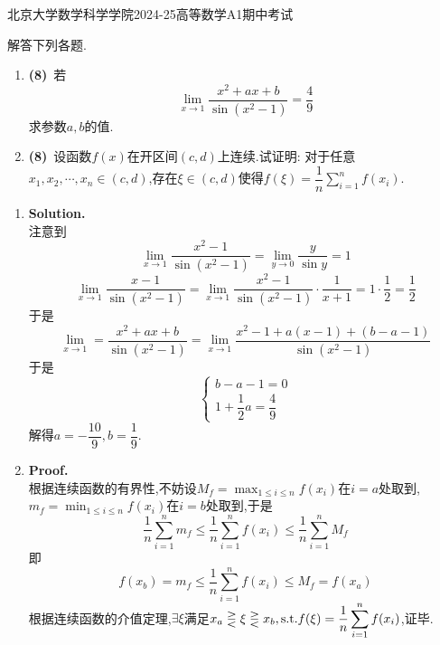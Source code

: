 \documentclass{ctexart}
\begin{document}
\pagestyle{empty}
\begin{center}\Large
    北京大学数学科学学院2024-25高等数学A1期中考试
\end{center}
\begin{problem}
    解答下列各题.
    \begin{enumerate}[label=\textbf{(\arabic*)}]
        \item \textbf{(8)}\ 若$$\lim_{x\to1}\dfrac{x^2+ax+b}{\sin\left(x^2-1\right)}=\dfrac{4}{9}$$求参数$a,b$的值.
        \item \textbf{(8)}\ 设函数$f(x)$在开区间$(c,d)$上连续.试证明:
            对于任意$x_1,x_2,\cdots,x_n\in(c,d)$,存在$\xi\in(c,d)$使得$\displaystyle f(\xi)=\dfrac{1}{n}\sum_{i=1}^{n}f(x_i)$.
    \end{enumerate}
\end{problem}
\begin{solution}
    \begin{enumerate}[label=\textbf{(\arabic*)}]
        \item \textbf{Solution.}\\
            注意到$$\lim_{x\to1}\dfrac{x^2-1}{\sin\left(x^2-1\right)}=\lim_{y\to 0}\dfrac{y}{\sin y}=1$$
            $$\lim_{x\to 1}\dfrac{x-1}{\sin\left(x^2-1\right)}=\lim_{x\to1}\dfrac{x^2-1}{\sin\left(x^2-1\right)}\cdot\dfrac{1}{x+1}=1\cdot\dfrac{1}{2}=\dfrac{1}{2}$$
            于是$$\lim_{x\to1}=\dfrac{x^2+ax+b}{\sin\left(x^2-1\right)}=\lim_{x\to1}\dfrac{x^2-1+a\left(x-1\right)+(b-a-1)}{\sin\left(x^2-1\right)}$$
            于是$$\left\{\begin{array}{l}
                b-a-1=0 \\
                1+\dfrac{1}{2}a=\dfrac{4}{9}
            \end{array}\right.$$
            解得$a=-\dfrac{10}{9},b=\dfrac{1}{9}$.
        \item \textbf{Proof.}\\
            根据连续函数的有界性,不妨设$\displaystyle M_f=\max_{1\leqslant i\leqslant n}f(x_i)$在$i=a$处取到,
            $\displaystyle m_f=\min_{1\leqslant i\leqslant n}f(x_i)$在$i=b$处取到,于是
            $$\dfrac{1}{n}\sum_{i=1}^{n}m_f\leqslant\dfrac{1}{n}\sum_{i=1}^{n}f(x_i)\leqslant\dfrac{1}{n}\sum_{i=1}^{n}M_f$$
            即$$f(x_b)=m_f\leqslant\dfrac{1}{n}\sum_{i=1}^{n}f(x_i)\leqslant M_f=f(x_a)$$
            根据连续函数的介值定理,$\exists\xi$满足$\displaystyle x_a\gtreqless\xi\gtreqless x_b,\text{s.t.} f(\xi)=\dfrac{1}{n}\sum_{i=1}^{n}f(x_i)$,证毕.
    \end{enumerate}
\end{solution}
\end{document}
